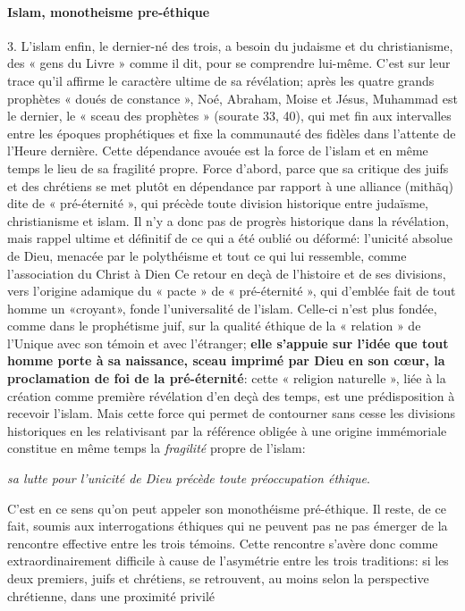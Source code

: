 \paragraph{Islam, monotheisme pre-éthique}
3. L'islam enfin, le dernier-né des trois, a besoin du judaisme et du christianisme, des « gens du Livre » comme il dit, pour se comprendre lui-même. C'est sur leur trace qu'il affirme le caractère ultime de sa révélation; après les quatre grands prophètes « doués de constance », Noé, Abraham, Moise et Jésus, Muhammad est le dernier, le « sceau des prophètes » (sourate 33, 40), qui met fin aux intervalles entre les époques prophétiques et fixe la communauté des fidèles dans l'attente de l'Heure dernière. Cette dépendance avouée est la force de l'islam et en même temps le lieu de sa fragilité propre.
Force d'abord, parce que sa critique des juifs et des chrétiens se met plutôt en dépendance par rapport à une alliance (mithãq) dite de « pré-éternité », qui précède toute division historique entre judaïsme, christianisme et islam. Il n'y a donc pas de progrès historique dans la révélation, mais rappel ultime et définitif de ce qui a été oublié ou déformé: l'unicité absolue de Dieu, menacée par le polythéisme et tout ce qui lui ressemble, comme l'association du Christ à Dien Ce retour en deçà de l'histoire et de ses divisions, vers l'origine adamique du « pacte » de « pré-éternité », qui d'emblée fait de tout homme un «croyant», fonde l'universalité de l'islam. Celle-ci n'est plus fondée, comme dans le prophétisme juif, sur la qualité éthique de la « relation » de l'Unique avec son témoin et avec l'étranger; \textbf{elle s'appuie sur l'idée que tout homme porte à sa naissance, sceau imprimé par Dieu en son cœur, la proclamation de foi de la pré-éternité}: cette « religion naturelle », liée à la création comme première révélation d'en deçà des temps, est une prédisposition à recevoir l'islam.
Mais cette force qui permet de contourner sans cesse les divisions historiques en les relativisant par la référence obligée à une origine immémoriale constitue en même temps la \textit{fragilité} propre de l'islam: 
\begin{Def}
\textit{sa lutte pour l'unicité de Dieu précède toute préoccupation éthique}. 
\end{Def}
C'est en ce sens qu'on peut appeler son monothéisme pré-éthique. Il reste, de ce fait, soumis aux interrogations éthiques qui ne peuvent pas ne pas émerger de la rencontre effective entre les trois témoins.
Cette rencontre s'avère donc comme extraordinairement difficile à cause de l'asymétrie entre les trois traditions: si les deux premiers, juifs et chrétiens, se retrouvent, au moins selon la perspective chrétienne, dans une proximité privilé
 
